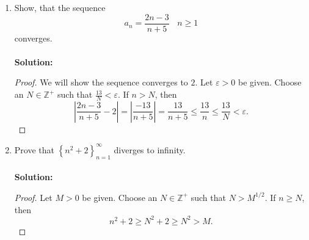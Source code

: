 \documentclass[12pt,letterpaper]{article}
\theoremstyle{plain}
\theoremstyle{definition}
\begin{document}
\begin{enumerate}[1.]
\begin{proof}
We claim that $\alpha=xy$. To see this we will show that given an $\varepsilon >0$ the number $xy-\varepsilon$ is not an upper bound. Since $x$ is the least upper bound of $X$ we have that $x-\frac{\varepsilon}{x+y}$ is not an upper bound and thus there exists an $\hat{x}\in X$ such that 
\[\hat{x}\geq x-\frac{\varepsilon}{x+y}.\]
Similarly, there exists a $\hat{y}\in Y$ such that 
\[\hat{y}\geq y-\frac{\varepsilon}{x+y}.\]
Note that 
\[\hat{x}\hat{y}\geq \left(x-\frac{\varepsilon}{x+y}\right) \left(y-\frac{\varepsilon}{x+y}\right)=xy-\varepsilon +\frac{\varepsilon^2}{(x+y)^2}>xy-\varepsilon\]
since $\frac{\varepsilon^2}{(x+y)^2}>0$. Hence there exists an element $\hat{x}\hat{y}\in XY$ such that 
\[\hat{x}\hat{y}>xy-\varepsilon\]
for any given $\varepsilon >0$. Thus we must have that $xy=\alpha$, i.e. $xy$ is the least upper bound of $XY$. 
\end{proof}
\item Show, that the sequence 
\[a_n=\frac{2n-3}{n+5}\ \ \ \ n\geq 1\] 
converges.\\
\ \\
{\bf Solution:}
\begin{proof}We will show the sequence converges to $2$.  Let $\varepsilon>0$ be given. Choose an $N\in \mathbb{Z}^+$ such that $\frac{13}{N}<\varepsilon$. If $n>N$, then 
\[\left|\frac{2n-3}{n+5}-2\right|=\left|\frac{-13}{n+5}\right |=\frac{13}{n+5}\leq \frac{13}{n}\leq \frac{13}{N}<\varepsilon.\]
\end{proof}
\item Prove that $\left \{n^2+2\right \}_{n=1}^\infty$ diverges to infinity. \\      
\ \\
{\bf Solution:}
\begin{proof} Let $M>0$ be given. Choose an $N\in \mathbb{Z}^+$ such that $N>M^{1/2}$. If $n\geq N$, then 
\[n^2+2\geq N^2+2\geq N^2>M.\]


\end{proof}



\end{enumerate}
\end{document}

